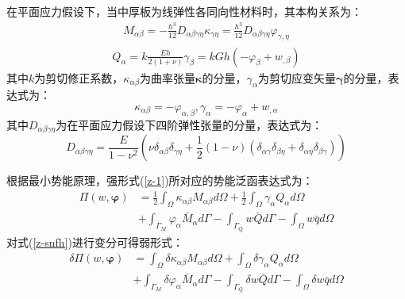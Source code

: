 在平面应力假设下，当中厚板为线弹性各同向性材料时，其本构关系为：
\begin{equation} 
    \begin{split}
    M_{\alpha \beta}=-\frac{h^3}{12}D_{\alpha \beta \gamma\eta}\kappa_{\gamma\eta}=\frac{h^3}{12}D_{\alpha \beta \gamma\eta}\varphi_{\gamma,\eta}
    \end{split}
\end{equation}
\begin{equation} 
    \begin{split}
    Q_{\alpha}=k\frac{Eh}{2(1+\nu)}\gamma_\beta=kGh(-\varphi_\beta+w_{,\beta})
    \end{split}
\end{equation}
其中$k$为剪切修正系数，$\kappa_{\alpha\beta}$为曲率张量$\pmb\kappa$的分量，$\gamma_\alpha$为剪切应变矢量$\pmb\gamma$的分量，表达式为：
\begin{equation} 
    \kappa_{\alpha\beta}=-\varphi_{\alpha,\beta},\gamma_\alpha=-\varphi_\alpha+w_{,\alpha}
\end{equation}
其中$D_{\alpha \beta \gamma\eta}$为在平面应力假设下四阶弹性张量的分量，表达式为：
\begin{equation} 
    D_{\alpha \beta \gamma\eta}=\frac{E}{1-\nu^2}(\nu\delta_{\alpha\beta}\delta_{\gamma\eta}+\frac{1}{2}(1-\nu)(\delta_{\alpha\gamma}\delta_{\beta\eta}+\delta_{\alpha\eta}\delta_{\beta\gamma}))
\end{equation}

根据最小势能原理，强形式(\ref{z-1})所对应的势能泛函表达式为： 
\begin{equation}\label{z-snfh}
\begin{split} 
    \Pi(w,\boldsymbol{\varphi})&=\frac{1}{2}\int_{\Omega}\kappa_{\alpha\beta}M_{\alpha\beta}d\Omega+\frac{1}{2}\int_{\Omega}\gamma_{\alpha}Q_{\alpha}d\Omega\\
    &+\int_{\Gamma_{M}}\varphi_{\alpha}{\bar{M}_{\alpha}}d\Gamma-\int_{\Gamma_{Q}}{w}\bar {Q}d\Gamma-\int_{\Omega} w\bar{q}d\Omega
\end{split}
\end{equation}
对式(\ref{z-snfh})进行变分可得弱形式：
\begin{equation}\label{z-rxs}
    \begin{split} 
        \delta\Pi(w,\boldsymbol{\varphi})&=\int_{\Omega}\delta\kappa_{\alpha\beta}M_{\alpha\beta}d\Omega+\int_{\Omega}\delta\gamma_{\alpha}Q_{\alpha}d\Omega\\
        &+\int_{\Gamma_{M}}\delta\varphi_{\alpha}{\bar{M}_{\alpha}}d\Gamma-\int_{\Gamma_{Q}}{\delta{w}}\bar {Q}d\Gamma-\int_{\Omega} \delta{w}\bar{q}d\Omega
    \end{split}
\end{equation}

